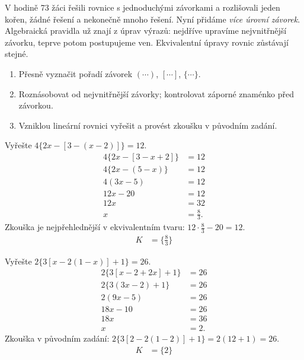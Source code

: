 \documentclass[11pt,a4paper]{article}
\begin{document}
V hodině 73 žáci řešili rovnice s jednoduchými závorkami a rozlišovali jeden kořen, žádné řešení a nekonečně mnoho řešení. Nyní přidáme \emph{více úrovní závorek}. Algebraická pravidla už znají z úprav výrazů: nejdříve upravíme nejvnitřnější závorku, teprve potom postupujeme ven. Ekvivalentní úpravy rovnic zůstávají stejné.
\begin{enumerate}[label=\arabic*.]
\item Přesně vyznačit pořadí závorek $(\cdots)$, $[\cdots]$, $\{\cdots\}$.
\item Roznásobovat od nejvnitřnější závorky; kontrolovat záporné znaménko před závorkou.
\item Vzniklou lineární rovnici vyřešit a provést zkoušku v původním zadání.
\end{enumerate}
\begin{prikladReseniBox}[title={Příklad 1}]
Vyřešte $4\{2x-[3-(x-2)]\}=12$.
\tcblower
\[
\begin{aligned}
4\{2x-[3-x+2]\}&=12\\
4\{2x-(5-x)\}&=12\\
4(3x-5)&=12\\
12x-20&=12\\
12x&=32\\
x&=\frac83.
\end{aligned}
\]
Zkouška je nejpřehlednější v ekvivalentním tvaru: $12\cdot\frac83-20=12$.
\[
\begin{aligned}
K &= \{\frac83\}
\end{aligned}
\]
\end{prikladReseniBox}
\begin{prikladReseniBox}[title={Příklad 2}]
Vyřešte $2\{3[x-2(1-x)]+1\}=26$.
\tcblower
\[
\begin{aligned}
2\{3[x-2+2x]+1\}&=26\\
2\{3(3x-2)+1\}&=26\\
2(9x-5)&=26\\
18x-10&=26\\
18x&=36\\
x&=2.
\end{aligned}
\]
Zkouška v původním zadání: $2\{3[2-2(1-2)]+1\}=2(12+1)=26$.
\[
\begin{aligned}
K &= \{2\}
\end{aligned}
\]
\end{prikladReseniBox}
\end{document}
